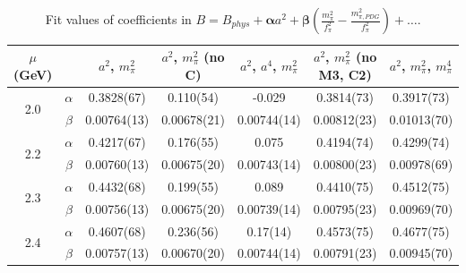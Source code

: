 \documentclass[12pt]{extarticle}
\begin{document}
\begin{table}[h!]
\begin{center}
\begin{tabular}{|c c|c|c|c|c|c|}
\hline
$\mu$ (GeV) &  & $a^2$, $m_\pi^2$& $a^2$, $m_\pi^2$ (no C)& $a^2$, $a^4$, $m_\pi^2$& $a^2$, $m_\pi^2$ (no M3, C2)& $a^2$, $m_\pi^2$, $m_\pi^4$\\
\hline
\multirow{2}{0.5in}{2.0} & $\alpha$ & 0.3828(67)& 0.110(54)& -0.029& 0.3814(73)& 0.3917(73)\\
 & $\beta$ & 0.00764(13)& 0.00678(21)& 0.00744(14)& 0.00812(23)& 0.01013(70)\\
\hline
\multirow{2}{0.5in}{2.2} & $\alpha$ & 0.4217(67)& 0.176(55)& 0.075& 0.4194(74)& 0.4299(74)\\
 & $\beta$ & 0.00760(13)& 0.00675(20)& 0.00743(14)& 0.00800(23)& 0.00978(69)\\
\hline
\multirow{2}{0.5in}{2.3} & $\alpha$ & 0.4432(68)& 0.199(55)& 0.089& 0.4410(75)& 0.4512(75)\\
 & $\beta$ & 0.00756(13)& 0.00675(20)& 0.00739(14)& 0.00795(23)& 0.00969(70)\\
\hline
\multirow{2}{0.5in}{2.4} & $\alpha$ & 0.4607(68)& 0.236(56)& 0.17(14)& 0.4573(75)& 0.4677(75)\\
 & $\beta$ & 0.00757(13)& 0.00670(20)& 0.00744(14)& 0.00791(23)& 0.00945(70)\\
\hline
\end{tabular}
\caption{Fit values of coefficients in $B = B_{phys} + \mathbf{\alpha} a^2 + \mathbf{\beta}\left(\frac{m_\pi^2}{f_\pi^2}-\frac{m_{\pi,PDG}^2}{f_\pi^2}\right) + \ldots$.}
\end{center}
\end{table}




















\clearpage
\end{document}
